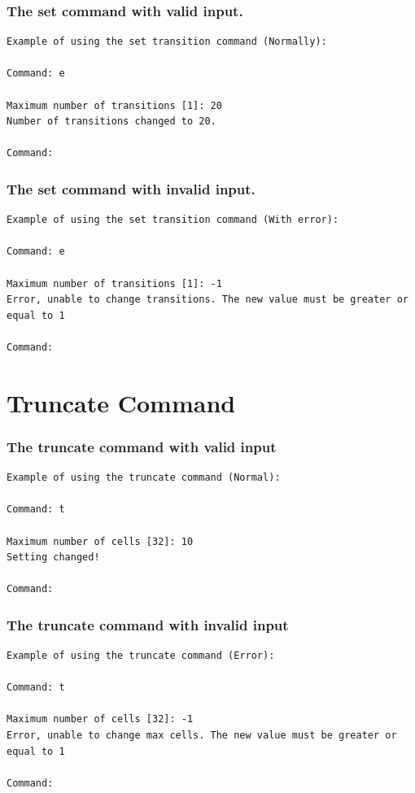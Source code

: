 \documentclass{report}
\begin{document}
\subsubsection{The set command with valid input.}
\begin{verbatim}
Example of using the set transition command (Normally):

Command: e

Maximum number of transitions [1]: 20
Number of transitions changed to 20.
    
Command: 
\end{verbatim}

\subsubsection{The set command with invalid input.}
\begin{verbatim}
Example of using the set transition command (With error):

Command: e

Maximum number of transitions [1]: -1
Error, unable to change transitions. The new value must be greater or equal to 1
    
Command: 
\end{verbatim}
     
     \section{Truncate Command}
     
\subsubsection{The truncate command with valid input}
     \begin{verbatim}
Example of using the truncate command (Normal):

Command: t

Maximum number of cells [32]: 10
Setting changed!
    
Command: 
\end{verbatim}

\subsubsection{The truncate command with invalid input}
\begin{verbatim}
Example of using the truncate command (Error):

Command: t

Maximum number of cells [32]: -1
Error, unable to change max cells. The new value must be greater or equal to 1
    
Command: 
\end{verbatim}
     
\end{document}
